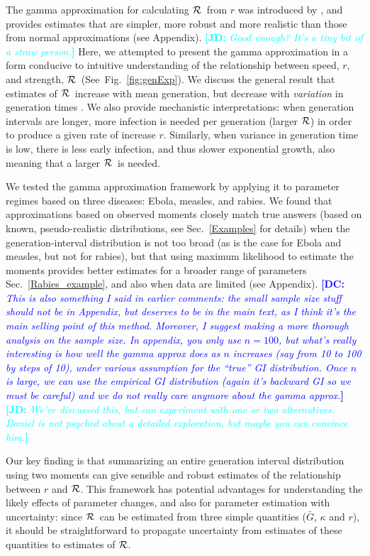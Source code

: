 \documentclass[12pt]{article}
\newcommand{\RR}{\ensuremath{{\cal R}}}
\newcommand{\fref}[1]{Fig.~\ref{fig:#1}}
\newcommand{\sref}[1]{Sec.~\ref{#1}}
\newcommand{\comment}[3]{\textcolor{#1}{\textbf{[#2: }\textit{#3}\textbf{]}}}
\newcommand{\jd}[1]{\comment{cyan}{JD}{#1}}
\newcommand{\dc}[1]{\comment{blue}{DC}{#1}}
\begin{document}
The gamma approximation for calculating \RR\ from $r$ was introduced by \cite{NishCast09}, and  provides estimates that are simpler, more robust and more realistic than those from normal approximations (see Appendix). \jd{Good enough? It's a tiny bit of a straw person.} 
Here, we attempted to present the gamma approximation in a form conducive to intuitive understanding of the relationship between speed, $r$, and strength, \RR\ (See~\fref{genExp}).
We discuss the general result that estimates of \RR\ increase with mean generation, but decrease with \emph{variation} in generation times \cite{WallLips07}.
We also provide mechanistic interpretations: when generation intervals are longer, more infection is needed per generation (larger \RR)  in order to produce a given rate of increase $r$. Similarly, when variance in generation time is low, there is less early infection, and thus slower exponential growth, also meaning that a larger \RR\ is needed. 

We tested the gamma approximation framework by applying it to parameter regimes based on three diseases: Ebola, measles, and rabies. 
We found that approximations based on observed moments closely match true answers (based on known, pseudo-realistic distributions, see \sref{Examples} for details) when the generation-interval distribution is not too broad (as is the case for Ebola and measles, but not for rabies), but that using maximum likelihood to estimate the moments provides better estimates for a broader range of parameters \sref{Rabies_example}, and also when data are limited (see Appendix).
\dc{This is also something I said in earlier comments: the small sample size stuff should not be in Appendix, but deserves to be in the main text, as I think it's the main selling point of this method. Moreover, I suggest making a more thorough analysis on the sample size. In appendix, you only use $n=100$, but what's really interesting is how well  the gamma approx does as $n$ increases (say from 10 to 100 by steps of 10), under various assumption for the ``true'' GI distribution. Once $n$ is large, we can use the empirical GI distribution (again it's backward GI so we must be careful) and we do not really care anymore about the gamma approx.}
\jd{We've discussed this, but can experiment with one or two alternatives. Daniel is not psyched about a detailed exploration, but maybe you can convince him.}

Our key finding is that summarizing an entire generation interval distribution using two moments can give sensible and robust estimates of the relationship between $r$ and \RR.
This framework has potential advantages for understanding the likely effects of parameter changes, and also for parameter estimation with uncertainty: since \RR\ can be estimated from three simple quantities ($\bar G$, $\kappa$ and $r$), it should be straightforward to propagate uncertainty from estimates of these quantities to estimates of \RR.
\end{document}
